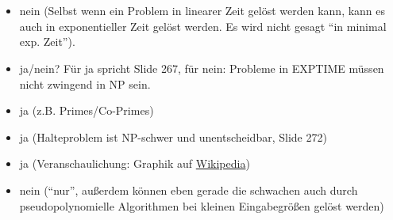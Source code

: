 \documentclass{article}
\begin{document}
\section{}
\begin{itemize}
	\item nein (Selbst wenn ein Problem in linearer Zeit gelöst werden kann, kann es auch in exponentieller Zeit gelöst werden. Es wird nicht gesagt "`in minimal exp. Zeit"').
  \item ja/nein? Für ja spricht Slide 267, für nein: Probleme in EXPTIME müssen nicht zwingend in NP sein.
  \item ja (z.B. Primes/Co-Primes)
  \item ja (Halteproblem ist NP-schwer und unentscheidbar, Slide 272)
  \item ja (Veranschaulichung: Graphik auf \href{http://en.wikipedia.org/wiki/NP-complete}{Wikipedia})
  \item nein ("`nur"', außerdem können eben gerade die schwachen auch durch pseudopolynomielle Algorithmen bei kleinen Eingabegrößen gelöst werden)
\end{itemize}
\end{document}
